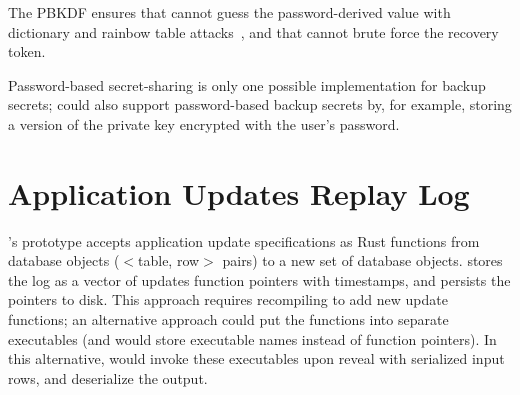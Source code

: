 The PBKDF ensures that \sys cannot guess the password-derived value with
dictionary and rainbow table attacks~\cite{pbkdf}, and that \sys cannot brute force
the recovery token.
%
%

%
%


%
Password-based secret-sharing is only one possible implementation for backup
secrets; \sys could also support password-based backup secrets by, for example, storing a
version of the private key encrypted with the user's password.
%

\section{Application Updates Replay Log}

\sys's prototype accepts application update specifications as Rust functions from database objects
($<$table, row$>$ pairs) to a new set of database objects. \sys stores the log
as a vector of updates function pointers with timestamps, and persists the
pointers to disk. This approach requires recompiling \sys to add new update
functions; an alternative approach could put the functions into separate
executables (and \sys would store executable names instead of function
pointers). In this alternative, \sys would invoke these executables upon reveal
with serialized input rows, and deserialize the output.

